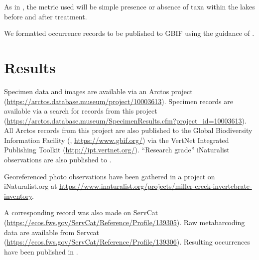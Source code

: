 \begin{multicols}{2}
As in \citet{Massengill2014, Massengill2017}, the metric used will be simple presence or absence of taxa within the lakes before and after treatment.

We formatted occurrence records to be published to GBIF using the guidance of \citet{Anderssonetal2020}.

\section{Results}

Specimen data and images are available via an Arctos project (\url{https://arctos.database.museum/project/10003613}). Specimen records are available via a search for records from this project (\url{https://arctos.database.museum/SpecimenResults.cfm?project_id=10003613}). All Arctos records from this project are also published to the Global Biodiversity Information Facility (, \url{https://www.gbif.org/}) via the VertNet Integrated Publishing Toolkit (\url{http://ipt.vertnet.org/}). ``Research grade'' iNaturalist observations are also published to .

Georeferenced photo observations have been gathered in a project on iNaturalist.org at \url{https://www.inaturalist.org/projects/miller-creek-invertebrate-inventory}.

A corresponding record was also made on ServCat (\url{https://ecos.fws.gov/ServCat/Reference/Profile/139305}). Raw metabarcoding data are available from Servcat (\url{https://ecos.fws.gov/ServCat/Reference/Profile/139306}). Resulting occurrences have been published in \citep{Bowser2022e}.

\end{multicols}


